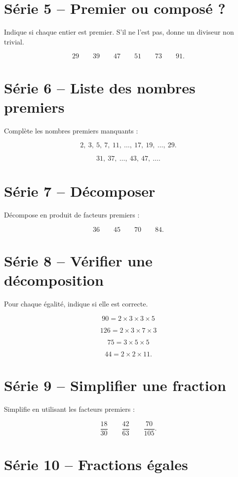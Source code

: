 \documentclass[12pt,a4paper]{article}
\begin{document}
\section*{Série 5 -- Premier ou composé ?}

Indique si chaque entier est premier.
S'il ne l'est pas, donne un diviseur non trivial.

\[
29\qquad 39\qquad 47\qquad 51\qquad 73\qquad 91.
\]

\section*{Série 6 -- Liste des nombres premiers}

Complète les nombres premiers manquants :

\[
2,\ 3,\ 5,\ 7,\ 11,\ \ldots,\ 17,\ 19,\ \ldots,\ 29.
\]

\[
31,\ 37,\ \ldots,\ 43,\ 47,\ \ldots.
\]

\section*{Série 7 -- Décomposer}

Décompose en produit de facteurs premiers :

\[
36\qquad 45\qquad 70\qquad 84.
\]

\section*{Série 8 -- Vérifier une décomposition}

Pour chaque égalité, indique si elle est correcte.

\[
90=2\times3\times3\times5
\]

\[
126=2\times3\times7\times3
\]

\[
75=3\times5\times5
\]

\[
44=2\times2\times11.
\]

\section*{Série 9 -- Simplifier une fraction}

Simplifie en utilisant les facteurs premiers :

\[
\frac{18}{30}
\qquad
\frac{42}{63}
\qquad
\frac{70}{105}.
\]

\section*{Série 10 -- Fractions égales}
\end{document}
